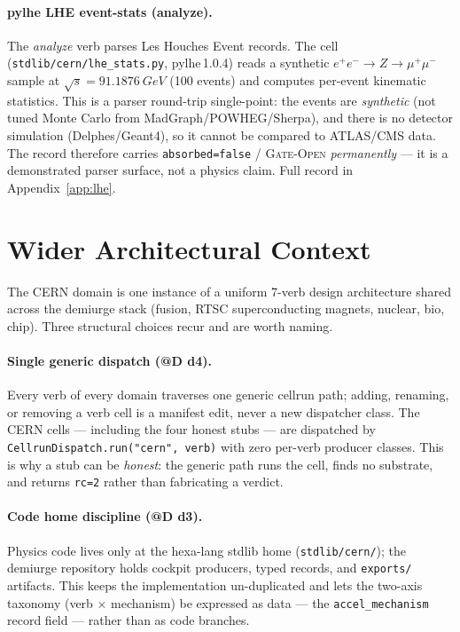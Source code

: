 \documentclass[11pt,a4paper]{article}
\begin{document}
\paragraph{pylhe LHE event-stats (analyze).} The \emph{analyze} verb
parses Les Houches Event records. The cell
(\verb|stdlib/cern/lhe_stats.py|, pylhe\,1.0.4) reads a synthetic
$e^+e^-\!\to Z\!\to\mu^+\mu^-$ sample at $\sqrt{s}=\SI{91.1876}{GeV}$
(100 events) and computes per-event kinematic statistics. This is a
parser round-trip single-point: the events are \emph{synthetic} (not
tuned Monte Carlo from MadGraph/POWHEG/Sherpa), and there is no detector
simulation (Delphes/Geant4), so it cannot be compared to ATLAS/CMS data.
The record therefore carries \texttt{absorbed=false} / \textsc{Gate-Open}
\emph{permanently} --- it is a demonstrated parser surface, not a physics
claim. Full record in Appendix~\ref{app:lhe}.

\section{Wider Architectural Context}
\label{sec:context}

The CERN domain is one instance of a uniform 7-verb design architecture
shared across the demiurge stack (fusion, RTSC superconducting magnets,
nuclear, bio, chip). Three structural choices recur and are worth naming.

\paragraph{Single generic dispatch (@D d4).} Every verb of every domain
traverses one generic cellrun path; adding, renaming, or removing a verb
cell is a manifest edit, never a new dispatcher class. The CERN cells ---
including the four honest stubs --- are dispatched by
\verb|CellrunDispatch.run("cern", verb)| with zero per-verb producer
classes. This is why a stub can be \emph{honest}: the generic path runs
the cell, finds no substrate, and returns \texttt{rc=2} rather than
fabricating a verdict.

\paragraph{Code home discipline (@D d3).} Physics code lives only at the
hexa-lang stdlib home (\verb|stdlib/cern/|); the demiurge repository holds
cockpit producers, typed records, and \verb|exports/| artifacts. This
keeps the implementation un-duplicated and lets the two-axis taxonomy
(verb $\times$ mechanism) be expressed as data --- the
\verb|accel_mechanism| record field --- rather than as code branches.
\end{document}
